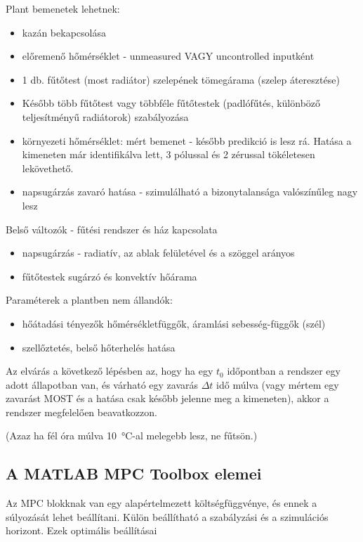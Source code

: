 \begin{formal}
	Plant bemenetek lehetnek:
	\begin{itemize}[noitemsep,topsep=-8pt,parsep=0pt,partopsep=0pt]
		\item kazán bekapcsolása
		\item előremenő hőmérséklet - unmeasured VAGY uncontrolled inputként
		\item 1 db. fűtőtest (most radiátor) szelepének tömegárama (szelep áteresztése)
		\item Később több fűtőtest vagy többféle fűtőtestek (padlófűtés, különböző teljesítményű radiátorok) szabályozása
		\item környezeti hőmérséklet: mért bemenet - később predikció is lesz rá. Hatása a kimeneten már identifikálva lett, 3 pólussal és 2 zérussal tökéletesen lekövethető.
		\item napsugárzás zavaró hatása - szimulálható  a bizonytalansága valószínűleg nagy lesz
	\end{itemize}

	Belső változók - fűtési rendszer és ház kapcsolata
	\begin{itemize}[noitemsep,topsep=-6pt,parsep=0pt,partopsep=0pt]
			\item napsugárzás - radiatív, az ablak felületével és a szöggel arányos
			\item fűtőtestek sugárzó és konvektív hőárama
	\end{itemize}

	Paraméterek a plantben nem állandók:
	\begin{itemize}[noitemsep,topsep=-6pt,parsep=0pt,partopsep=0pt]
		\item hőátadási tényezők hőmérsékletfüggők, áramlási sebesség-függők (szél)
		\item szellőztetés, belső hőterhelés hatása
	\end{itemize}
\end{formal}

Az elvárás a következő lépésben az, hogy ha egy $t_0$ időpontban a rendszer egy adott állapotban van, és várható egy zavarás $\Delta t$ idő múlva (vagy mértem egy zavarást MOST és a hatása csak később jelenne meg a kimeneten), akkor a rendszer megfelelően beavatkozzon.

(Azaz ha fél óra múlva \SI{10}{\celsius}-al melegebb lesz, ne fűtsön.)

\subsection{A MATLAB MPC Toolbox elemei}
Az MPC blokknak van egy alapértelmezett költségfüggvénye, és ennek a súlyozását lehet beállítani.
Külön beállítható a szabályzási és a szimulációs horizont.
Ezek optimális beállításai 

